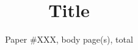 \documentclass[sigconf,10pt]{acmart}
\begin{document}
\title{Title}


\author{Paper \#XXX, \pageref{end_of_body} body page(s), \pageref{last_page} total}

\renewcommand{\shortauthors}{X.et al.}



\maketitle





\label{end_of_body}




\label{last_page}
\end{document}
